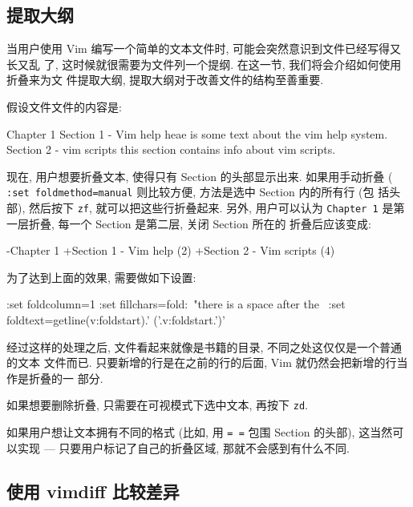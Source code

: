 \subsection{提取大纲}
\label{subsec:simple_text_file_outlining}

当用户使用 Vim 编写一个简单的文本文件时, 可能会突然意识到文件已经写得又长又乱
了, 这时候就很需要为文件列一个提纲. 在这一节, 我们将会介绍如何使用折叠来为文
件提取大纲, 提取大纲对于改善文件的结构至善重要.

假设文件文件的内容是:
\begin{vimcode}
Chapter 1
Section 1 - Vim help
heae is some text about the vim help system.
Section 2 - vim scripts
this section contains info about vim scripts.
\end{vimcode}

现在, 用户想要折叠文本, 使得只有 Section 的头部显示出来. 如果用手动折叠 (
\texttt{:set foldmethod=manual} 则比较方便, 方法是选中 Section 内的所有行 (包
括头部), 然后按下 \texttt{zf}, 就可以把这些行折叠起来. 另外, 用户可以认为
\texttt{Chapter 1} 是第一层折叠, 每一个 Section 是第二层, 关闭 Section 所在的
折叠后应该变成:
\begin{vimcode}
-Chapter 1
+Section 1 - Vim help   (2)
+Section 2 - Vim scripts    (4)
\end{vimcode}

\begin{warning}
    为了达到上面的效果, 需要做如下设置:
    \begin{vimcode}
    :set foldcolumn=1
    :set fillchars=fold:\  "there is a space after the \
    :set foldtext=getline(v:foldstart).'    ('.v:foldstart.')'
    \end{vimcode}
\end{warning}

经过这样的处理之后, 文件看起来就像是书籍的目录, 不同之处这仅仅是一个普通的文本
文件而已. 只要新增的行是在之前的行的后面, Vim 就仍然会把新增的行当作是折叠的一
部分.

如果想要删除折叠, 只需要在可视模式下选中文本, 再按下 \texttt{zd}.

如果用户想让文本拥有不同的格式 (比如, 用 \texttt{= =} 包围 Section 的头部),
这当然可以实现 --- 只要用户标记了自己的折叠区域, 那就不会感到有什么不同.

\subsection{使用 vimdiff 比较差异}
\label{subsec:using_vimdiff_to_track_the_changes}

